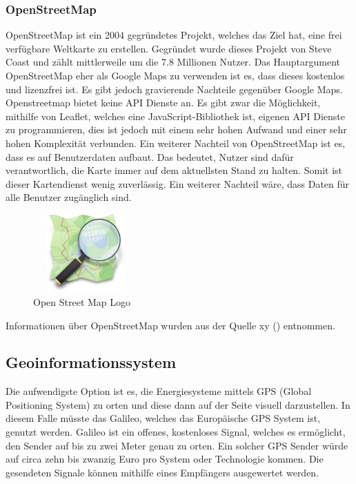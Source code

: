 \subsubsection{OpenStreetMap}\label{sec:OpenStreetMap}


OpenStreetMap ist ein 2004 gegründetes Projekt, welches das Ziel hat, eine frei verfügbare Weltkarte zu erstellen. Gegründet wurde dieses Projekt von Steve Coast und zählt mittlerweile um die 7.8 Millionen Nutzer. Das Hauptargument OpenStreetMap eher als Google Maps zu verwenden ist es, dass dieses kostenlos und lizenzfrei ist. Es gibt jedoch gravierende Nachteile gegenüber Google Maps. Openstreetmap bietet keine API Dienste an. Es gibt zwar die Möglichkeit, mithilfe von Leaflet, welches eine JavaScript-Bibliothek ist, eigenen API Dienste zu programmieren, dies ist jedoch mit einem sehr hohen Aufwand und einer sehr hohen Komplexität verbunden. Ein weiterer Nachteil von OpenStreetMap ist es, dass es auf Benutzerdaten aufbaut. Das bedeutet, Nutzer sind  dafür verantwortlich, die Karte immer auf dem aktuellsten Stand zu halten. Somit ist dieser Kartendienst wenig zuverlässig.
Ein weiterer Nachteil wäre, dass Daten für alle Benutzer zugänglich sind. 
\begin{figure}[h]
	\centering
	\includegraphics[height=3cm,width=4cm]{images/OpenStreetMap_Logo}
	\caption{Open Street Map Logo}
	\label{fig:Open Street Map Logo}
\end{figure}

Informationen über OpenStreetMap wurden aus der Quelle xy () entnommen.
\newpage

\subsection{Geoinformationssystem }
Die aufwendigste Option ist es, die Energiesysteme mittels GPS (Global Positioning System) zu orten und diese dann auf der Seite visuell darzustellen. In diesem Falle müsste das Galileo, welches das Europäische GPS System ist, genutzt werden. Galileo ist ein offenes, kostenloses Signal, welches es ermöglicht, den Sender auf bis zu zwei Meter genau zu orten. Ein solcher GPS Sender würde auf circa zehn bis zwanzig Euro pro System oder Technologie kommen. Die gesendeten Signale können mithilfe eines Empfängers ausgewertet werden.

